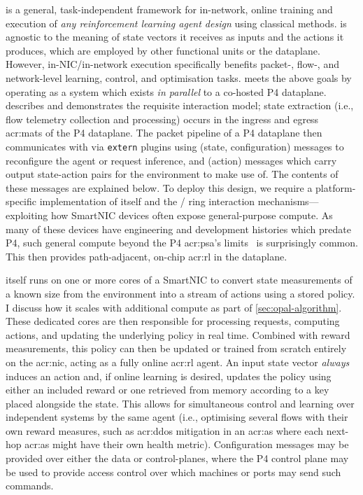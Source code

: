 \approachshort{} is a general, task-independent framework for in-network, online training and execution of \emph{any reinforcement learning agent design} using classical methods.
\approachshort{} is agnostic to the meaning of state vectors it receives as inputs and the actions it produces, which are employed by other functional units or the dataplane.
However, in-NIC/in-network execution specifically benefits packet-, flow-, and network-level learning, control, and optimisation tasks.
\approachshort{} meets the above goals by operating as a system which exists \emph{in parallel} to a co-hosted P4 dataplane.
 describes and demonstrates the requisite interaction model; state extraction (i.e., flow telemetry collection and processing) occurs in the ingress and egress \glspl{acr:mat} of the P4 dataplane.
The packet pipeline of a P4 dataplane then communicates with \approachshort{} via \texttt{extern} plugins using \inring{} (state, configuration) messages to reconfigure the agent or request inference, and \outring{} (action) messages which carry output state-action pairs for the environment to make use of.
The contents of these messages are explained below.
To deploy this design, we require a platform-specific implementation of \approachshort{} itself and the \inring{}/\outring{} ring interaction mechanisms---exploiting how SmartNIC devices often expose general-purpose compute.
As many of these devices have engineering and development histories which predate P4, such general compute beyond the P4 \gls{acr:psa}'s limits~\parencite{p4-psa} is surprisingly common.
This then provides path-adjacent, on-chip \gls{acr:rl} in the dataplane.

\approachshort{} itself runs on one or more cores of a SmartNIC to convert state measurements of a known size from the environment into a stream of actions using a stored policy.
I discuss how it scales with additional compute as part of \cref{sec:opal-algorithm}.
These dedicated cores are then responsible for processing requests, computing actions, and updating the underlying policy in real time.
Combined with reward measurements, this policy can then be updated or trained from scratch entirely on the \gls{acr:nic}, acting as a fully online \gls{acr:rl} agent.
An input state vector \emph{always} induces an action and, if online learning is desired, updates the policy using either an included reward or one retrieved from memory according to a key placed alongside the state.
This allows for simultaneous control and learning over independent systems by the same agent (i.e., optimising several flows with their own reward measures, such as \gls{acr:ddos} mitigation in an \gls{acr:as} where each next-hop \gls{acr:as} might have their own health metric).
Configuration messages may be provided over either the data or control-planes, where the P4 control plane may be used to provide access control over which machines or ports may send such commands.

